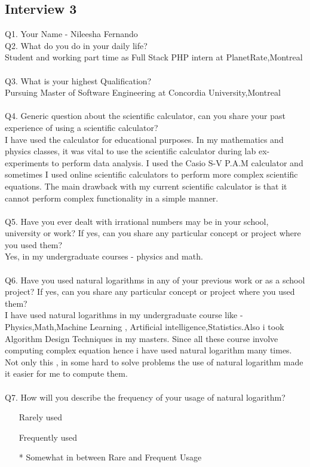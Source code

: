 \documentclass{article}
\makeatletter
\newcommand*{\radiobutton}{%
  \@ifstar{\@radiobutton0}{\@radiobutton1}%
}
\newcommand*{\@radiobutton}[1]{%
  \begin{tikzpicture}
    \pgfmathsetlengthmacro\radius{height("X")/2}
    \draw[radius=\radius] circle;
    \ifcase#1 \fill[radius=.6*\radius] circle;\fi
  \end{tikzpicture}%
}
\makeatother
\begin{document}
\subsection{Interview 3}
Q1. Your Name -  Nileesha Fernando\\
Q2. What do you do in your daily life?\\
Student and working part time as Full Stack PHP intern at PlanetRate,Montreal\\\\ 
Q3. What is your highest Qualification?\\
Pursuing Master of Software Engineering at Concordia University,Montreal\\\\
Q4. Generic question about the scientific calculator, can you share your past experience of using a scientific calculator?\\
I have used the calculator for educational purposes. In my mathematics
and physics classes, it was vital to use the scientific calculator during lab ex-
experiments to perform data analysis. I used the Casio S-V P.A.M calculator and
sometimes I used online scientific calculators to perform more complex scientific equations. The main drawback with my current scientific calculator is that it cannot perform complex functionality in a simple manner.\\\\
Q5. Have you ever dealt with irrational numbers may be in your school, university or work? If yes, can you share any particular concept or project where you used them?\\
Yes, in my undergraduate courses - physics and math.\\\\
Q6. Have you used natural logarithms in any of your previous work or as a school project? If yes, can you share any particular concept or project where you used them?\\
I have used natural logarithms in my undergraduate course like - Physics,Math,Machine Learning , Artificial intelligence,Statistics.Also i took Algorithm Design Techniques in my masters. Since all these course involve computing complex equation hence i have used natural logarithm many times. Not only this , in some hard to solve problems the use of natural logarithm made it easier for me to compute them.\\\\
Q7. How will you describe the frequency of your usage of natural logarithm?
\begin{itemize}
\item[\radiobutton] Rarely used
\item[\radiobutton] Frequently used
\item[\radiobutton*] Somewhat in between Rare and Frequent Usage
\end{itemize}
\end{document}
